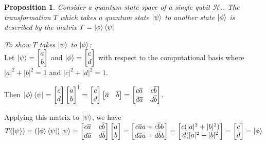 \documentclass[12pt,twoside,fleqn]{report}
\makeatletter
\theoremstyle{thmstyle}
\renewenvironment{proof}[1][\proofname]{\par
\pushQED{\qed}%
\normalfont \topsep6\p@\@plus6\p@\relax
\trivlist
\item[\hskip\labelsep\itshape#1\@addpunct{.}]\mbox{}\par\nobreak\ignorespaces
}{%
    \popQED\endtrivlist\@endpefalse
    }
\newtheorem{prop}{Proposition}[chapter]
\makeatother
\begin{document}
\begin{prop}
    Consider a quantum state space of a single qubit $\mathcal{H}$..
    The transformation $T$ which takes a quantum state $\ket\psi$ to another state $\ket\phi$ is described by the matrix $T = \ket{\phi}\bra{\psi}$
\end{prop}
\begin{proof}
    \emph{To show $T$ takes $\ket{\psi}$ to $\ket{\phi}$: }\\
    Let $\ket\psi = \begin{bmatrix} a \\ b \end{bmatrix}$ and $\ket\phi = \begin{bmatrix} c \\ d \end{bmatrix}$ with respect to the computational basis where $|a|^2 + |b|^2 = 1$ and $|c|^2 + |d|^2 = 1$.

        Then $\ket\phi \bra\psi = \begin{bmatrix} c \\ d \end{bmatrix}\begin{bmatrix} a \\ b \end{bmatrix}^\dagger = \begin{bmatrix} c \\ d \end{bmatrix} \begin{bmatrix} \overline{a} & \overline{b} \end{bmatrix} = \begin{bmatrix} c \overline{a} & c \overline{b} \\ d \overline{a} & d \overline{b} \end{bmatrix}$.

            Applying this matrix to $\ket\psi$, we have $T (\ket\psi) = (\ket\phi \bra\psi) \ket\psi =   \begin{bmatrix} c \overline{a} & c \overline{b} \\ d \overline{a} & d \overline{b} \end{bmatrix} \begin{bmatrix} a \\ b \end{bmatrix} = \begin{bmatrix} c \overline{a} a + c \overline{b} b \\ d \overline{a} a + d \overline{b} b\end{bmatrix} = \begin{bmatrix} c (|a|^2 + |b|^2) \\ d (|a|^2 + |b|^2 \end{bmatrix} = \begin{bmatrix} c \\ d \end{bmatrix} = \ket{\phi}$

\end{proof}
\end{document}
